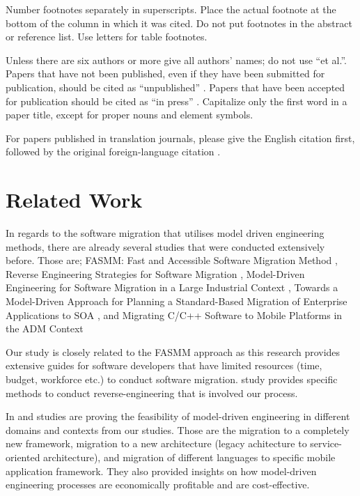 \documentclass[conference]{IEEEtran}
\begin{document}
Number footnotes separately in superscripts. Place the actual footnote at 
the bottom of the column in which it was cited. Do not put footnotes in the 
abstract or reference list. Use letters for table footnotes.

Unless there are six authors or more give all authors' names; do not use 
``et al.''. Papers that have not been published, even if they have been 
submitted for publication, should be cited as ``unpublished'' \cite{b4}. Papers 
that have been accepted for publication should be cited as ``in press'' \cite{b5}. 
Capitalize only the first word in a paper title, except for proper nouns and 
element symbols.

For papers published in translation journals, please give the English 
citation first, followed by the original foreign-language citation \cite{b6}.

\section{Related Work}
In regards to the software migration that utilises model driven engineering methods,
there are already several studies that were conducted extensively before.
Those are; FASMM: 
Fast and Accessible Software Migration Method \cite{b3}, Reverse Engineering 
Strategies for Software Migration \cite{b4}, Model-Driven Engineering 
for Software Migration in a Large Industrial Context \cite{b5},  
Towards a Model-Driven Approach for Planning a 
Standard-Based Migration of Enterprise Applications to SOA  \cite{b6}, and
Migrating C/C++ Software to Mobile Platforms in the ADM Context \cite{b2}

Our study is closely related to the FASMM approach \cite{b3} as this research
provides extensive guides for software developers that have limited 
resources (time, budget, workforce etc.) to conduct software migration. 
\cite{b4} study provides specific methods to conduct reverse-engineering 
that is involved our process.

In \cite{b5} and \cite{b6} studies are proving the feasibility of model-driven engineering
in different domains and contexts from our studies. Those are the migration to a completely new framework, 
migration to a new architecture (legacy achitecture to service-oriented architecture), and migration
of different languages to specific mobile application framework. 
They also provided insights on how model-driven engineering processes are economically
profitable and are cost-effective. 
\end{document}
